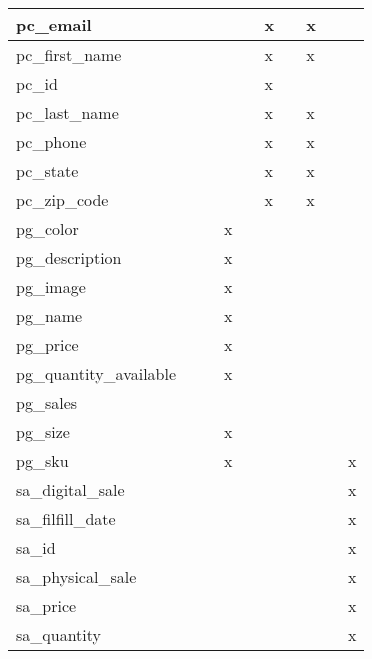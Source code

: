 \documentclass[11pt, a4paper]{report}
\begin{document}
\begin{longtable}{|l|l|l|l|l|l|l|l|l|l|}
pc\_email               &                &   &   &   & x &   & x &   &   \\ \hline
pc\_first\_name         &                &   &   &   & x &   & x &   &   \\ \hline
pc\_id                  &                &   &   &   & x &   &   &   &   \\ \hline
pc\_last\_name          &                &   &   &   & x &   & x &   &   \\ \hline
pc\_phone               &                &   &   &   & x &   & x &   &   \\ \hline
pc\_state               &                &   &   &   & x &   & x &   &   \\ \hline
pc\_zip\_code           &                &   &   &   & x &   & x &   &   \\ \hline
pg\_color               &                &   & x &   &   &   &   &   &   \\ \hline
pg\_description         &                &   & x &   &   &   &   &   &   \\ \hline
pg\_image               &                &   & x &   &   &   &   &   &   \\ \hline
pg\_name                &                &   & x &   &   &   &   &   &   \\ \hline
pg\_price               &                &   & x &   &   &   &   &   &   \\ \hline
pg\_quantity\_available &                &   & x &   &   &   &   &   &   \\ \hline
pg\_sales               &                &   &   &   &   &   &   &   &   \\ \hline
pg\_size                &                &   & x &   &   &   &   &   &   \\ \hline
pg\_sku                 &                &   & x &   &   &   &   &   & x \\ \hline
sa\_digital\_sale       &                &   &   &   &   &   &   &   & x \\ \hline
sa\_filfill\_date       &                &   &   &   &   &   &   &   & x \\ \hline
sa\_id                  &                &   &   &   &   &   &   &   & x \\ \hline
sa\_physical\_sale      &                &   &   &   &   &   &   &   & x \\ \hline
sa\_price               &                &   &   &   &   &   &   &   & x \\ \hline
sa\_quantity            &                &   &   &   &   &   &   &   & x \\ \hline

\end{longtable}
\end{document}
